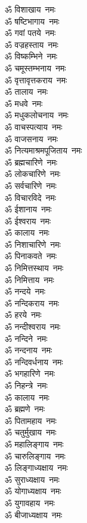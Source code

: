 \begin{multicols}{2}
\begin{flushleft}
ॐ विशाखाय~नमः\\
ॐ षष्टिभागाय~नमः\\
ॐ गवां पतये~नमः\\
ॐ वज्रहस्ताय~नमः\\
ॐ विष्कम्भिने~नमः\\
ॐ चमूस्तम्भनाय~नमः\\
ॐ वृत्तावृत्तकराय~नमः\\
ॐ तालाय~नमः\\
ॐ मधवे~नमः\\
ॐ मधुकलोचनाय~नमः\hfill{}\\
ॐ वाचस्पत्याय~नमः\\
ॐ वाजसनाय~नमः\\
ॐ नित्यमाश्रमपूजिताय~नमः\\
ॐ ब्रह्मचारिणे~नमः\\
ॐ लोकचारिणे~नमः\\
ॐ सर्वचारिणे~नमः\\
ॐ विचारविदे~नमः\\
ॐ ईशानाय~नमः\\
ॐ ईश्वराय~नमः\\
ॐ कालाय~नमः\hfill{}\\
ॐ निशाचारिणे~नमः\\
ॐ पिनाकवते~नमः\\
ॐ निमित्तस्थाय~नमः\\
ॐ निमित्ताय~नमः\\
ॐ नन्दये~नमः\\
ॐ नन्दिकराय~नमः\\
ॐ हरये~नमः\\
ॐ नन्दीश्वराय~नमः\\
ॐ नन्दिने~नमः\\
ॐ नन्दनाय~नमः\hfill{}\\
ॐ नन्दिवर्धनाय~नमः\\
ॐ भगहारिणे~नमः\\
ॐ निहन्त्रे~नमः\\
ॐ कालाय~नमः\\
ॐ ब्रह्मणे~नमः\\
ॐ पितामहाय~नमः\\
ॐ चतुर्मुखाय~नमः\\
ॐ महालिङ्गाय~नमः\\
ॐ चारुलिङ्गाय~नमः\\
ॐ लिङ्गाध्यक्षाय~नमः\hfill{}\\
ॐ सुराध्यक्षाय~नमः\\
ॐ योगाध्यक्षाय~नमः\\
ॐ युगावहाय~नमः\\
ॐ बीजाध्यक्षाय~नमः\\

\end{flushleft}
\end{multicols}
